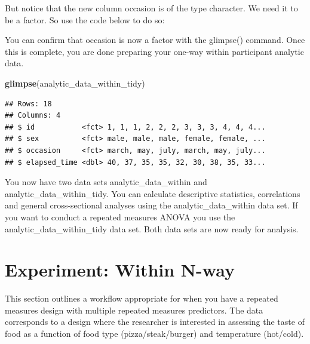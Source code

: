 \documentclass[
]{krantz}
\makeatletter
\newenvironment{Shaded}{\begin{snugshade}}{\end{snugshade}}
\newcommand{\DataTypeTok}[1]{\textcolor[rgb]{0.27,0.27,0.27}{#1}}
\newcommand{\KeywordTok}[1]{\textcolor[rgb]{0.27,0.27,0.27}{\textbf{#1}}}
\newcommand{\NormalTok}[1]{#1}
\newcommand{\OperatorTok}[1]{\textcolor[rgb]{0.43,0.43,0.43}{\textbf{#1}}}
\newcommand{\StringTok}[1]{\textcolor[rgb]{0.5,0.5,0.5}{#1}}
\newenvironment{kframe}{%
\medskip{}
\setlength{\fboxsep}{.8em}
 \def\at@end@of@kframe{}%
 \ifinner\ifhmode%
  \def\at@end@of@kframe{\end{minipage}}%
  \begin{minipage}{\columnwidth}%
 \fi\fi%
 \def\FrameCommand##1{\hskip\@totalleftmargin \hskip-\fboxsep
 \colorbox{shadecolor}{##1}\hskip-\fboxsep
     \hskip-\linewidth \hskip-\@totalleftmargin \hskip\columnwidth}%
 \MakeFramed {\advance\hsize-\width
   \@totalleftmargin\z@ \linewidth\hsize
   \@setminipage}}%
 {\par\unskip\endMakeFramed%
 \at@end@of@kframe}
\renewenvironment{Shaded}{\begin{kframe}}{\end{kframe}}
\makeatother
\begin{document}
But notice that the new column occasion is of the type character. We need it to be a factor. So use the code below to do so:

\begin{Shaded}
\end{Shaded}

You can confirm that occasion is now a factor with the glimpse() command. Once this is complete, you are done preparing your one-way within participant analytic data.

\begin{Shaded}
\begin{Highlighting}[]
\KeywordTok{glimpse}\NormalTok{(analytic_data_within_tidy)}
\end{Highlighting}
\end{Shaded}

\begin{verbatim}
## Rows: 18
## Columns: 4
## $ id           <fct> 1, 1, 1, 2, 2, 2, 3, 3, 3, 4, 4, 4...
## $ sex          <fct> male, male, male, female, female, ...
## $ occasion     <fct> march, may, july, march, may, july...
## $ elapsed_time <dbl> 40, 37, 35, 35, 32, 30, 38, 35, 33...
\end{verbatim}

You now have two data sets analytic\_data\_within and analytic\_data\_within\_tidy. You can calculate descriptive statistics, correlations and general cross-sectional analyses using the analytic\_data\_within data set. If you want to conduct a repeated measures ANOVA you use the analytic\_data\_within\_tidy data set. Both data sets are now ready for analysis.

\hypertarget{experiment-within-n-way}{%
\section{Experiment: Within N-way}\label{experiment-within-n-way}}

This section outlines a workflow appropriate for when you have a repeated measures design with multiple repeated measures predictors. The data corresponds to a design where the researcher is interested in assessing the taste of food as a function of food type (pizza/steak/burger) and temperature (hot/cold).
\end{document}
